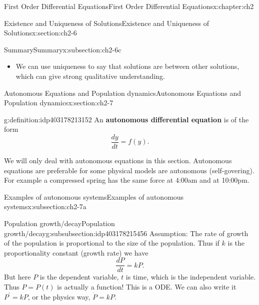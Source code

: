 \documentclass[oneside,10pt,]{book}
\newcommand{\terminology}[1]{\textbf{#1}}
\numberwithin{equation}{section}
\numberwithin{equation}{section}
\begin{document}
\begin{chapterptx}{First Order Differential Equations}{}{First Order Differential Equations}{}{}{x:chapter:ch2}
\begin{sectionptx}{Existence and Uniqueness of Solutions}{}{Existence and Uniqueness of Solutions}{}{}{x:section:ch2-6}
\begin{subsectionptx}{Summary}{}{Summary}{}{}{x:subsection:ch2-6c}
\begin{itemize}[label=\textbullet]
\item{}We can use uniqueness to say that solutions are between other solutions, which can give strong qualitative understanding.%
\end{itemize}
\end{subsectionptx}
\end{sectionptx}
%
%
\typeout{************************************************}
\typeout{************************************************}
%
\begin{sectionptx}{Autonomous Equations and Population dynamics}{}{Autonomous Equations and Population dynamics}{}{}{x:section:ch2-7}
\begin{introduction}{}%
\begin{definition}{}{g:definition:idp403178213152}%
An \terminology{autonomous differential equation} is of the form%
\begin{equation*}
\frac{dy}{dt}=f(y).
\end{equation*}
%
\end{definition}
We will only deal with autonomous equations in this section. Autonomous equations are preferable for some physical models are autonomous (self-govering). For example a compressed spring has the same force at 4:00am and at 10:00pm.%
\end{introduction}%
%
%
\typeout{************************************************}
\typeout{************************************************}
%
\begin{subsectionptx}{Examples of autonomous systems}{}{Examples of autonomous systems}{}{}{x:subsection:ch2-7a}
%
%
\typeout{************************************************}
\typeout{************************************************}
%
\begin{subsubsectionptx}{Population growth\slash{}decay}{}{Population growth\slash{}decay}{}{}{g:subsubsection:idp403178215456}
Assumption: The rate of growth of the population is proportional to the size of the population. Thus if \(k\) is the proportionality constant (growth rate) we have%
\begin{equation*}
\frac{dP}{dt}=kP.
\end{equation*}
But here \(P\) is the dependent variable, \(t\) is time, which is the independent variable. Thus \(P=P(t)\) is actually a function! This is a ODE. We can also write it \(P^{\prime}=kP\), or the physics way, \(\dot{P}=kP\).%

\end{subsubsectionptx}
\end{subsectionptx}
\end{sectionptx}
\end{chapterptx}
\end{document}
